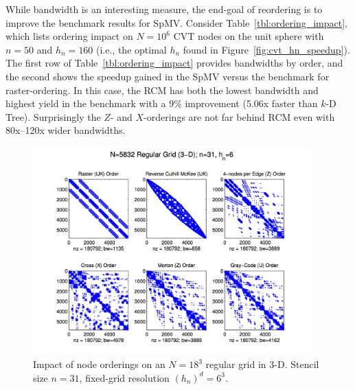 \documentclass{report}
\begin{document}
While bandwidth is an interesting measure, the end-goal of reordering is to improve the benchmark results for SpMV. Consider Table~\ref{tbl:ordering_impact}, which lists ordering impact on $N=10^6$ CVT nodes on the unit sphere with $n=50$ and $h_n=160$ (i.e., the optimal $h_n$ found in Figure~\ref{fig:cvt_hn_speedup}). 
The first row of Table~\ref{tbl:ordering_impact} provides bandwidths by order, and the second shows the speedup gained in the SpMV versus the benchmark for raster-ordering. In this case, the RCM has both the lowest bandwidth and highest yield in the benchmark with a 9\% improvement (5.06x faster than $k$-D Tree). Surprisingly the $Z$- and $X$-orderings are not far behind RCM even with 80x--120x wider bandwidths. 

\begin{figure}[ht]
\centering
\includegraphics[width=0.95\textwidth]{rbffd_methods_content/hashing/spy_regulargrid_N18d3_n31_hn6.png} 
\caption{Impact of node orderings on an $N=18^3$ regular grid in 3-D. Stencil size $n=31$, fixed-grid resolution $(h_n)^d=6^3$. }
\label{fig:ordering_impact_rg}
\end{figure}
\end{document}
